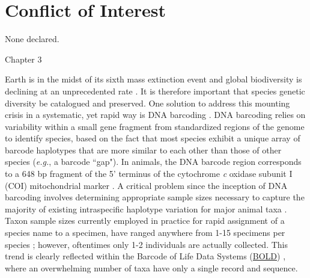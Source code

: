 \section*{Conflict of Interest}

None declared.

Chapter 3

Earth is in the midst of its sixth mass extinction event and global biodiversity is \\ declining at an unprecedented rate \cite{ceballos2015accelerated}. It is therefore important that species genetic \\ diversity be catalogued and preserved. One solution to address this mounting crisis in a systematic, yet rapid way is DNA barcoding \cite{hebert2003biological}. DNA barcoding relies on variability within a small gene fragment from standardized regions of the genome to identify species, based on the fact that most species exhibit a unique array of barcode haplotypes that are more similar to each other than those of other species (\textit{e.g.}, a barcode ``gap"). In animals, the DNA barcode region corresponds to a 648 bp fragment of the 5' terminus of the cytochrome \textit{c} oxidase subunit I (COI) mitochondrial marker \cite{hebert2003biological, hebert2003barcoding}. A critical problem since the inception of DNA barcoding involves determining appropriate sample sizes necessary to capture the majority of existing intraspecific haplotype variation for major animal taxa \cite{hebert2004identification, meyer2005dna, ward2005dna}. Taxon sample sizes currently employed in practice for rapid assignment of a species name to a specimen, have ranged anywhere from 1-15 specimens per species \cite{goodall2012comparison, jin2012simple, matz2005likelihood, ross2008testing, yao2017evaluating}; however, oftentimes only 1-2 individuals are actually collected. This trend is clearly reflected within the Barcode of Life Data Systems (\href{http://www.boldsystems.org}{BOLD}) \cite{ratnasingham2007bold}, where an overwhelming number of taxa have only a single record and sequence.

 

